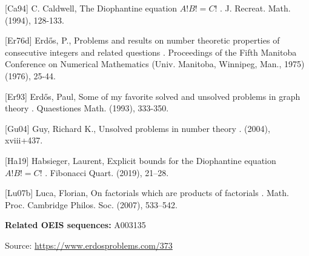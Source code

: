 \documentclass{article}
\begin{document}
[Ca94] C. Caldwell, The Diophantine equation $A!B!=C!$ . J. Recreat. Math. (1994), 128-133.

[Er76d] Erd\H{o}s, P., Problems and results on number theoretic properties of consecutive integers and related questions . Proceedings of the Fifth Manitoba Conference on Numerical Mathematics (Univ. Manitoba, Winnipeg, Man., 1975) (1976), 25-44.

[Er93] Erd\H{o}s, Paul, Some of my favorite solved and unsolved problems in graph theory . Quaestiones Math. (1993), 333-350.

[Gu04] Guy, Richard K., Unsolved problems in number theory . (2004), xviii+437.

[Ha19] Habsieger, Laurent, Explicit bounds for the {D}iophantine equation {$A!B!=C!$} . Fibonacci Quart. (2019), 21--28.

[Lu07b] Luca, Florian, On factorials which are products of factorials . Math. Proc. Cambridge Philos. Soc. (2007), 533--542.

\noindent\textbf{Related OEIS sequences:} A003135


\bigskip
\noindent\small{Source: \url{https://www.erdosproblems.com/373}}
\end{document}
